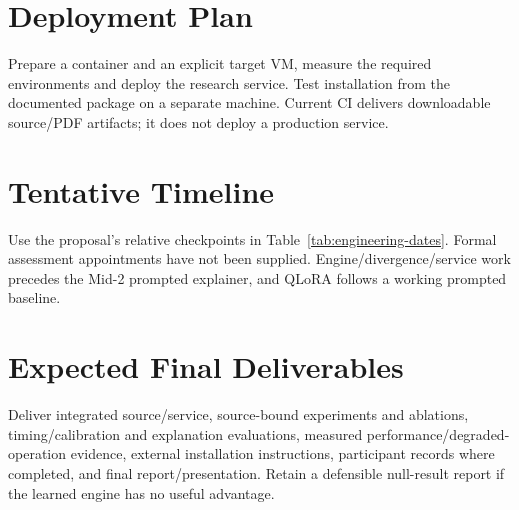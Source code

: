 \section{Deployment Plan}
Prepare a container and an explicit target VM, measure the required environments and deploy the research service. Test installation from the documented package on a separate machine. Current CI delivers downloadable source/PDF artifacts; it does not deploy a production service.
\section{Tentative Timeline}
Use the proposal's relative checkpoints in Table~\ref{tab:engineering-dates}. Formal assessment appointments have not been supplied. Engine/divergence/service work precedes the Mid-2 prompted explainer, and QLoRA follows a working prompted baseline.
\section{Expected Final Deliverables}
Deliver integrated source/service, source-bound experiments and ablations, timing/calibration and explanation evaluations, measured performance/degraded-operation evidence, external installation instructions, participant records where completed, and final report/presentation. Retain a defensible null-result report if the learned engine has no useful advantage.
